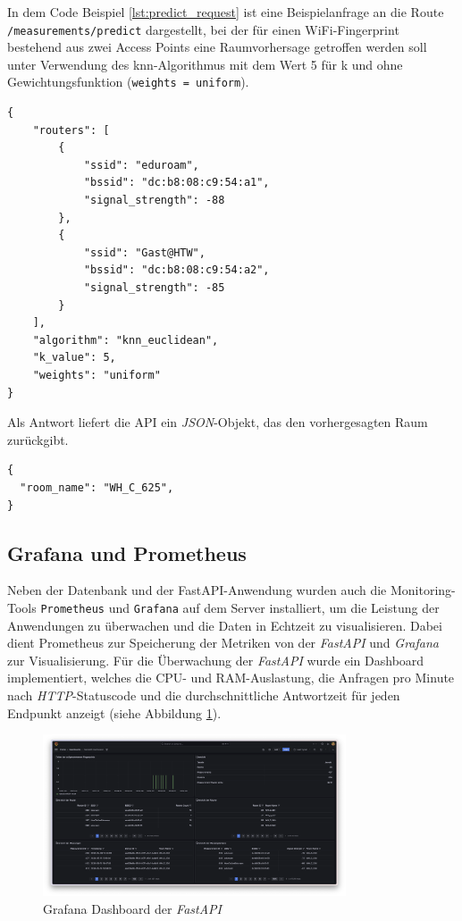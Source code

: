 In dem Code Beispiel \ref{lst:predict_request} ist eine Beispielanfrage an die Route \texttt{/measurements/predict} dargestellt, bei der für einen WiFi-Fingerprint bestehend aus zwei Access Points eine Raumvorhersage getroffen werden soll unter Verwendung des \gls{knn}-Algorithmus mit dem Wert 5 für k und ohne Gewichtungsfunktion (\texttt{weights = uniform}).

\begin{lstlisting}[caption={Beispiel für eine Anfrage an \texttt{/measurements/predict}}, label={lst:predict_request}]
{
    "routers": [
        {
            "ssid": "eduroam",
            "bssid": "dc:b8:08:c9:54:a1",
            "signal_strength": -88
        },
        {
            "ssid": "Gast@HTW",
            "bssid": "dc:b8:08:c9:54:a2",
            "signal_strength": -85
        }
    ],
    "algorithm": "knn_euclidean",
    "k_value": 5,
    "weights": "uniform"
}
\end{lstlisting}

Als Antwort liefert die API ein \textit{JSON}-Objekt, das den vorhergesagten Raum zurückgibt.

\begin{lstlisting}[caption={Beispiel einer API-Antwort von \texttt{/measurements/predict}}]
{
  "room_name": "WH_C_625",
}
\end{lstlisting}

\subsection{Grafana und Prometheus}

Neben der Datenbank und der FastAPI-Anwendung wurden auch die Monitoring-Tools \texttt{Pro\discretionary{-}{}{}metheus} und \texttt{Grafana} auf dem Server installiert, um die Leistung der Anwendungen zu überwachen und die Daten in Echtzeit zu visualisieren. Dabei dient Prometheus zur Speicherung der Metriken von der \textit{FastAPI} und \textit{Grafana} zur Visualisierung. Für die Überwachung der \textit{FastAPI} wurde ein Dashboard implementiert, welches die CPU- und RAM-Auslastung, die Anfragen pro Minute nach \textit{HTTP}-Statuscode und die durchschnittliche Antwortzeit für jeden Endpunkt anzeigt (siehe Abbildung \ref{fig:grafana_fast_api_screenshot}).  

\begin{figure}[h]
    \centering
    \includegraphics[width=0.8\textwidth]{images/grafana_fast_api_screenshot.png}
    \caption{Grafana Dashboard der \textit{FastAPI}}
    \label{fig:grafana_fast_api_screenshot}
\end{figure}

